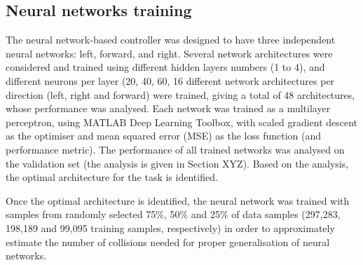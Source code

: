 \subsection{Neural networks training}

The neural network-based controller was designed to have three independent neural networks: left, forward, and right. Several network architectures were considered and trained using different hidden layers numbers (1 to 4), and different neurons per layer (20, 40, 60, 16 different network architectures per direction (left, right and forward) were trained, giving a total of 48 architectures, whose performance was analysed. Each network was trained as a multilayer perceptron, using MATLAB Deep Learning Toolbox, with scaled gradient descent as the optimiser and mean squared error (MSE) as the loss function (and performance metric). The performance of all trained networks was analysed on the validation set (the analysis is given in Section XYZ). Based on the analysis, the optimal architecture for the task is identified.



Once the optimal architecture is identified, the neural network was trained with samples from randomly selected 75\%, 50\% and 25\% of data samples (297,283, 198,189 and 99,095 training samples, respectively) in order to approximately estimate the number of collisions needed for proper generalisation of neural networks. 

